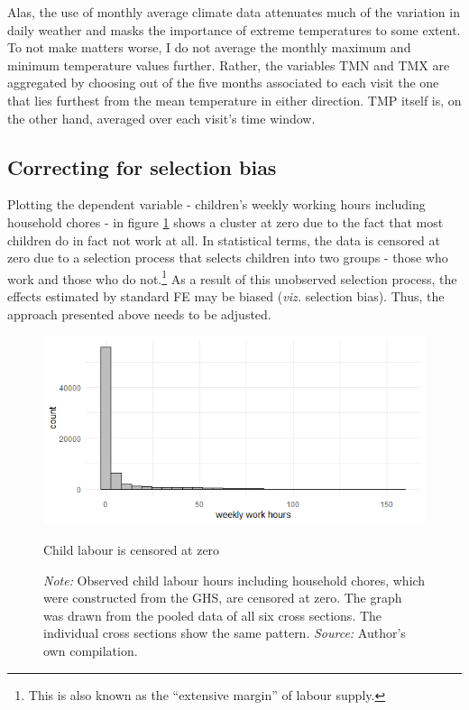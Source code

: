 \documentclass[a4paper,12pt]{article}
\theoremstyle{plain}
\theoremstyle{definition}
\theoremstyle{definition}
\theoremstyle{definition}
\theoremstyle{definition}
\begin{document}
Alas, the use of monthly average climate data attenuates much of the variation in daily weather and masks the importance of extreme temperatures to some extent. To not make matters worse, I do not average the monthly maximum and minimum temperature values further. Rather, the variables TMN and TMX are aggregated by choosing out of the five months associated to each visit the one that lies furthest from the mean temperature in either direction. TMP itself is, on the other hand, averaged over each visit's time window.

\subsection{Correcting for selection bias}
\label{sub:sample_selection}

Plotting the dependent variable - children's weekly working hours including household chores -  in figure \ref{fig:censored} shows a cluster at zero due to the fact that most children do in fact not work at all. In statistical terms, the data is censored at zero due to a selection process that selects children into two groups - those who work and those who do not.\footnote{This is also known as the ``extensive margin'' of labour supply.} As a result of this unobserved selection process, the effects estimated by standard FE may be biased (\textit{viz.} selection bias). Thus, the approach presented above needs to be adjusted.

\begin{figure}[h]
    \centering
    \includegraphics[scale=0.75]{../outputs/childworkchores.png}
    \caption{Child labour is censored at zero}
    \caption*{\footnotesize{\textit{Note:} Observed child labour hours including household chores, which were constructed from the GHS, are censored at zero. The graph was drawn from the pooled data of all six cross sections. The individual cross sections show the same pattern. \textit{Source:} Author's own compilation.}}
    \label{fig:censored}
\end{figure}
\end{document}
